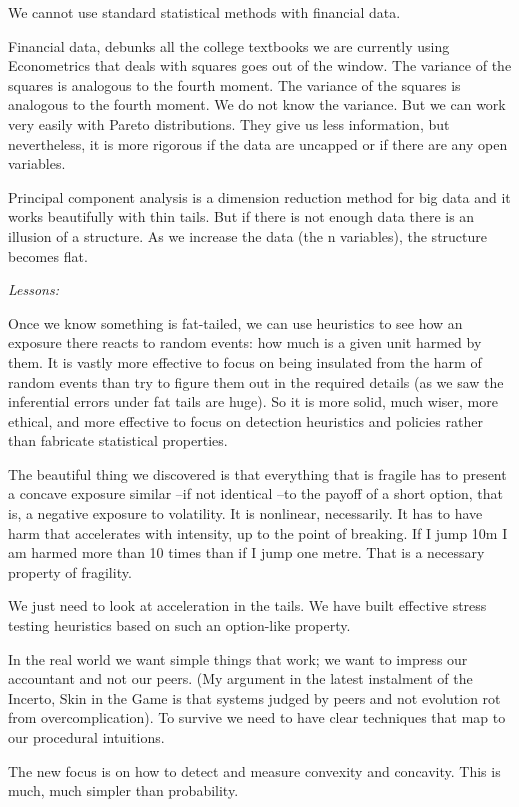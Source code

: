 \documentclass[
]{book}
\begin{document}
We cannot use standard statistical methods with financial data.

Financial data, debunks all the college textbooks we are currently using
Econometrics that deals with squares goes out of the window.
The variance of the squares is analogous to the fourth moment.
The variance of the squares is analogous to the fourth moment.
We do not know the variance. But we can work very easily
with Pareto distributions. They give us less information, but
nevertheless, it is more rigorous if the data are uncapped or if
there are any open variables.

Principal component analysis is a dimension
reduction method for big data and it works beautifully with
thin tails. But if there is not enough data there is an illusion
of a structure. As we increase the data (the n variables),
the structure becomes flat.

\emph{Lessons:}

Once we know something is fat-tailed, we can use heuristics to see
how an exposure there reacts to random events: how much
is a given unit harmed by them. It is vastly more effective
to focus on being insulated from the harm of random events
than try to figure them out in the required details (as we saw
the inferential errors under fat tails are huge). So it is more
solid, much wiser, more ethical, and more effective to focus on
detection heuristics and policies rather than fabricate statistical
properties.

The beautiful thing we discovered is that everything that is
fragile has to present a concave exposure similar --if not
identical --to the payoff of a short option, that is, a negative
exposure to volatility. It is nonlinear, necessarily. It has to
have harm that accelerates with intensity, up to the point of
breaking. If I jump 10m I am harmed more than 10 times than
if I jump one metre. That is a necessary property of fragility.

We just need to look at acceleration in the tails. We have built
effective stress testing heuristics based on such an option-like
property.

In the real world we want simple things that work;
we want to impress our accountant and not our peers. (My
argument in the latest instalment of the Incerto, Skin in the
Game is that systems judged by peers and not evolution rot
from overcomplication). To survive we need to have clear
techniques that map to our procedural intuitions.

The new focus is on how to detect and measure convexity and concavity.
This is much, much simpler than probability.
\end{document}
